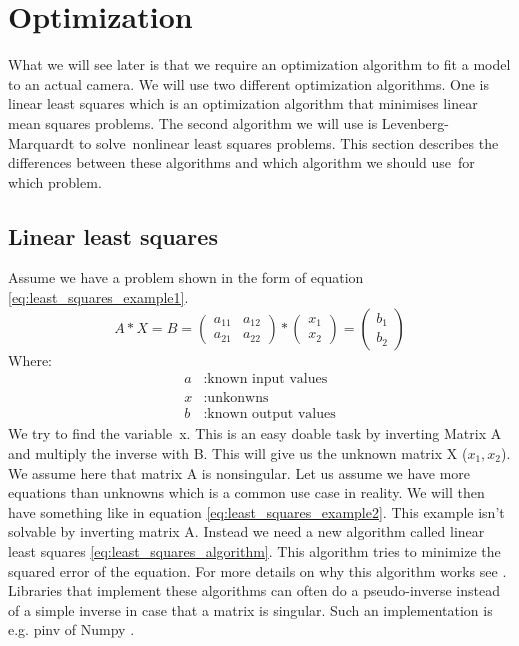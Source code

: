 \documentclass[11pt,a4paper,titlepage,oneside]{report}
\begin{document}
\section{Optimization}
What we will see later is that we require an optimization algorithm to fit a model to an actual camera. We will use two different optimization algorithms. One is linear least squares which is an optimization algorithm that minimises linear mean squares problems. The second algorithm we will use is Levenberg-Marquardt to solve nonlinear least squares problems. This section describes the differences between these algorithms and which algorithm we should use for which problem.

\subsection{Linear least squares}
Assume we have a problem shown in the form of equation \ref{eq:least_squares_example1}.
\begin{equation}\label{eq:least_squares_example1}
  A*X=B=\begin{pmatrix}
    a_{11} & a_{12} \\
    a_{21} & a_{22}
  \end{pmatrix}*
  \begin{pmatrix}
    x_1 \\
    x_2
  \end{pmatrix}=
  \begin{pmatrix}
    b_1 \\
    b_2
  \end{pmatrix}
\end{equation}
Where:
\begin{align*}
  a		  &: \text{known input values}\\
  x	  	&: \text{unkonwns}\\
  b		  &: \text{known output values}
\end{align*}
We try to find the variable x. This is an easy doable task by inverting Matrix A and multiply the inverse with B. This will give us the unknown matrix X ($x_1,x_2$). We assume here that matrix A is nonsingular. Let us assume we have more equations than unknowns which is a common use case in reality. We will then have something like in equation \ref{eq:least_squares_example2}. This example isn't solvable by inverting matrix A. Instead we need a new algorithm called linear least squares \ref{eq:least_squares_algorithm}. This algorithm tries to minimize the squared error of the equation. For more details on why this algorithm works see \cite{Hayes}. Libraries that implement these algorithms can often do a pseudo-inverse instead of a simple inverse in case that a matrix is singular. Such an implementation is e.g. pinv of Numpy \cite{pinv}.
\end{document}
